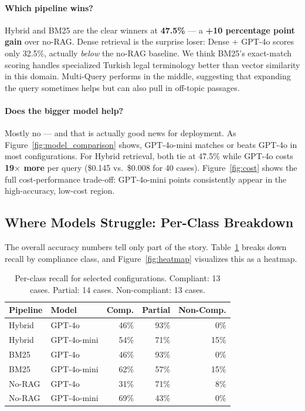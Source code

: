 \paragraph{Which pipeline wins?}
Hybrid and BM25 are the clear winners at \textbf{47.5\%} --- a
\textbf{+10 percentage point gain} over no-RAG.
Dense retrieval is the surprise loser: Dense + GPT-4o scores only 32.5\%,
actually \textit{below} the no-RAG baseline.
We think BM25's exact-match scoring handles specialized Turkish legal
terminology better than vector similarity in this domain.
Multi-Query performs in the middle, suggesting that expanding the query
sometimes helps but can also pull in off-topic passages.

\paragraph{Does the bigger model help?}
Mostly no --- and that is actually good news for deployment.
As Figure~\ref{fig:model_comparison} shows, GPT-4o-mini matches or beats
GPT-4o in most configurations.
For Hybrid retrieval, both tie at 47.5\% while GPT-4o costs
\textbf{19$\times$ more} per query (\$0.145 vs.\ \$0.008 for 40 cases).
Figure~\ref{fig:cost} shows the full cost-performance trade-off:
GPT-4o-mini points consistently appear in the high-accuracy, low-cost region.

\subsection{Where Models Struggle: Per-Class Breakdown}

The overall accuracy numbers tell only part of the story.
Table~\ref{tab:perclass} breaks down recall by compliance class, and
Figure~\ref{fig:heatmap} visualizes this as a heatmap.

\begin{table}[H]
\centering
\footnotesize
\caption{Per-class recall for selected configurations.
  Compliant: 13 cases. Partial: 14 cases. Non-compliant: 13 cases.}
\label{tab:perclass}
\begin{tabular}{llrrr}
\toprule
Pipeline    & Model        & Comp. & Partial & Non-Comp. \\
\midrule
Hybrid      & GPT-4o       & 46\%  & 93\%    & 0\% \\
Hybrid      & GPT-4o-mini  & 54\%  & 71\%    & 15\% \\
BM25        & GPT-4o       & 46\%  & 93\%    & 0\% \\
BM25        & GPT-4o-mini  & 62\%  & 57\%    & 15\% \\
No-RAG      & GPT-4o       & 31\%  & 71\%    & 8\% \\
No-RAG      & GPT-4o-mini  & 69\%  & 43\%    & 0\% \\
\bottomrule
\end{tabular}
\end{table}

